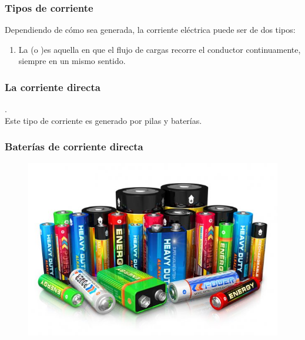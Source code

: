 \documentclass[14pt]{beamer}
\begin{document}
\begin{frame}
\frametitle{Tipos de corriente}
Dependiendo de cómo sea generada, la corriente eléctrica puede ser de dos tipos:
\pause
{}
\begin{enumerate}[<+->]
\item La  (o )\pause es aquella en que el flujo de cargas recorre el conductor continuamente, siempre en un mismo sentido.
\seti
\end{enumerate}
\end{frame}
\begin{frame}
\frametitle{La corriente directa}
.
\\
\bigskip
\pause
Este tipo de corriente es generado por pilas y baterías.
\end{frame}
\begin{frame}
\frametitle{Baterías de corriente directa}
\begin{figure}
    \centering
    \includegraphics[scale=0.6]{Imagenes/Baterias_01.jpg}
\end{figure}
\end{frame}
\end{document}
